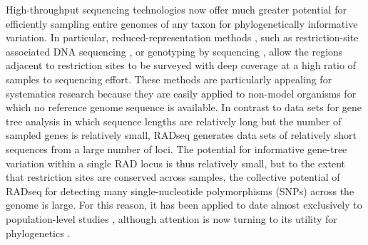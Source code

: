 \documentclass[12pt,letterpaper]{article}
\begin{document}








High-throughput sequencing technologies now offer much greater
potential for efficiently sampling entire genomes of any taxon for
phylogenetically informative variation. In particular,
reduced-representation methods {\citep[reviewed in][]{davey_radseq:_2010}, }
such as restriction-site associated DNA sequencing
\citep[RADseq;][]{miller_rapid_2007,baird_rapid_2008,rowe_rad_2011},
or genotyping by sequencing \citep[GBS;][]{elshire_robust_2011}, allow
the regions adjacent to restriction sites to be surveyed with deep
coverage at a high ratio of samples to sequencing effort.  These
methods are particularly appealing for systematics research because
they are easily applied to non-model organisms for which no reference
genome sequence is available. In contrast to data sets for gene tree
analysis in which sequence lengths are relatively long but the number
of sampled genes is relatively small, RADseq generates data sets of
relatively short sequences from a large number of loci. The potential
for informative gene-tree variation within a single RAD locus is thus
relatively small, but to the extent that restriction sites are
conserved across samples, the collective potential of RADseq for
detecting many single-nucleotide polymorphisms (SNPs) across the
genome is large. For this reason, it has been applied to date almost
exclusively to population-level studies \citep{baird_rapid_2008,
emerson_resolving_2010, hohenlohe_nextgeneration_2011,
baxter_linkage_2011, pfender_mapping_2011}, although attention is
now turning to its utility for phylogenetics
\citep[e.g.,][]{rubin_inferring_2012}.
\end{document}
